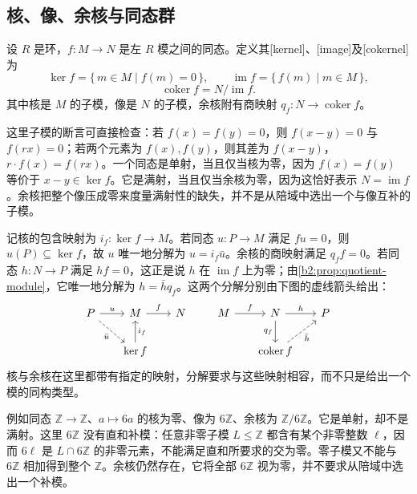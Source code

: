 \subsection{核、像、余核与同态群}
\label{b2:subsec:0202:02}

\begin{definition}\label{b2:def:module-kernel-image-cokernel}
	设 \(R\) 是环，\(f:M\to N\) 是左 \(R\) 模之间的同态。定义其[kernel]、[image]及[cokernel]为
	\[
		\ker f=\{\,m\in M\mid f(m)=0\,\},\qquad \operatorname{im}f=\{\,f(m)\mid m\in M\,\},
	\]
	\[
		\operatorname{coker}f=N/\operatorname{im}f.
	\]
	其中核是 \(M\) 的子模，像是 \(N\) 的子模，余核附有商映射 \(q_f:N\to\operatorname{coker}f\)。
\end{definition}

这里子模的断言可直接检查：若 \(f(x)=f(y)=0\)，则 \(f(x-y)=0\) 与 \(f(rx)=0\)；若两个元素为 \(f(x),f(y)\)，则其差为 \(f(x-y)\)，\(r\cdot f(x)=f(rx)\)。一个同态是单射，当且仅当核为零，因为 \(f(x)=f(y)\) 等价于 \(x-y\in\ker f\)。它是满射，当且仅当余核为零，因为这恰好表示 \(N=\operatorname{im}f\)。余核把整个像压成零来度量满射性的缺失，并不是从陪域中选出一个与像互补的子模。

\ProseParagraphBreak
记核的包含映射为 \(i_f:\ker f\to M\)。若同态 \(u:P\to M\) 满足 \(fu=0\)，则 \(u(P)\subseteq\ker f\)，故 \(u\) 唯一地分解为 \(u=i_f\bar u\)。余核的商映射满足 \(q_ff=0\)。若同态 \(h:N\to P\) 满足 \(hf=0\)，这正是说 \(h\) 在 \(\operatorname{im}f\) 上为零；由\cref{b2:prop:quotient-module}，它唯一地分解为 \(h=\bar hq_f\)。这两个分解分别由下图的虚线箭头给出：
\[
	\begin{tikzcd}[column sep=1.7em,row sep=2em]
		P\arrow[r,"u"]\arrow[dr,dashed,"\bar u"']&M\arrow[r,"f"]&N\\
		&\ker f\arrow[u,"i_f"']&
	\end{tikzcd}
	\qquad
	\begin{tikzcd}[column sep=1.7em,row sep=2em]
		M\arrow[r,"f"]&N\arrow[r,"h"]\arrow[d,"q_f"']&P\\
		&\operatorname{coker}f\arrow[ur,dashed,"\bar h"']&
	\end{tikzcd}
\]
核与余核在这里都带有指定的映射，分解要求与这些映射相容，而不只是给出一个模的同构类型。

\ProseParagraphBreak
例如同态 \(\mathbb Z\to\mathbb Z\)、\(a\mapsto6a\) 的核为零、像为 \(6\mathbb Z\)、余核为 \(\mathbb Z/6\mathbb Z\)。它是单射，却不是满射。这里 \(6\mathbb Z\) 没有直和补模：任意非零子模 \(L\le\mathbb Z\) 都含有某个非零整数 \(\ell\)，因而 \(6\ell\) 是 \(L\cap6\mathbb Z\) 的非零元素，不能满足直和所要求的交为零。零子模又不能与 \(6\mathbb Z\) 相加得到整个 \(\mathbb Z\)。余核仍然存在，它将全部 \(6\mathbb Z\) 视为零，并不要求从陪域中选出一个补模。

